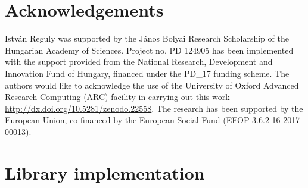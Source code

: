 \documentclass[number]{elsarticle}
\begin{document}
\section*{Acknowledgements}
Istv\'an Reguly was supported by the J\'anos Bolyai Research Scholarship of the Hungarian Academy of Sciences. Project no. PD 124905 has been implemented with the support provided from the National Research, Development and Innovation Fund of Hungary, financed under the PD\_17 funding scheme. The authors would like to acknowledge the use of
the University of Oxford Advanced Research Computing (ARC) facility in carrying
out this work \url{http://dx.doi.org/10.5281/zenodo.22558}. The research has
been supported by the European Union, co-financed by the European Social Fund
(EFOP-3.6.2-16-2017-00013).
%
%



%
%
\appendix

\section{Library implementation}\label{library-implementation}





\end{document}
